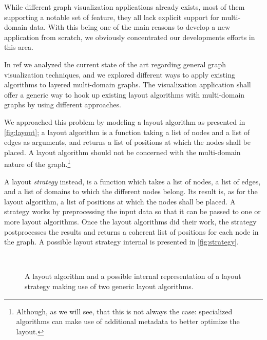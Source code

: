 While different graph visualization applications already exists, most of them supporting a notable set of feature, they all lack explicit support for multi-domain data. With this being one of the main reasons to develop a new application from scratch, we obviously concentrated our developments efforts in this area.

In ref we analyzed the current state of the art regarding general graph visualization techniques, and we explored different ways to apply existing algorithms to layered multi-domain graphs. The visualization application shall offer a generic way to hook up existing layout algorithms with multi-domain graphs by using different approaches.

We approached this problem by modeling a layout algorithm as presented in \vref{fig:layout}; a layout algorithm is a function taking a list of nodes and a list of edges as arguments, and returns a list of positions at which the nodes shall be placed. A layout algorithm should not be concerned with the multi-domain nature of the graph.\footnote{Although, as we will see, that this is not always the case: specialized algorithms can make use of additional metadata to better optimize the layout.}

A layout \emph{strategy} instead, is a function which takes a list of nodes, a list of edges, and a list of domains to which the different nodes belong. Its result is, as for the layout algorithm, a list of positions at which the nodes shall be placed. A strategy works by preprocessing the input data so that it can be passed to one or more layout algorithms. Once the layout algorithms did their work, the strategy postprocesses the results and returns a coherent list of positions for each node in the graph. A possible layout strategy internal is presented in \vref{fig:strategy}.

\begin{figure}
  \\
  \caption{A layout algorithm and a possible internal representation of a layout strategy making use of two generic layout algorithms.}
  \label{fig:layout-strategy}
\end{figure}

